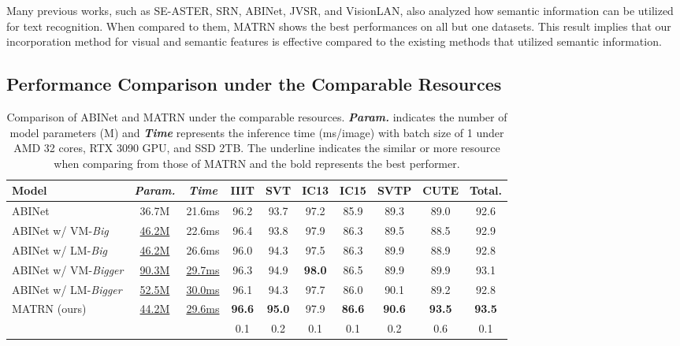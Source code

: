 \documentclass[runningheads]{llncs}
\begin{document}
Many previous works, such as SE-ASTER, SRN, ABINet, JVSR, and VisionLAN, also analyzed how semantic information can be utilized for text recognition. When compared to them, MATRN shows the best performances on all but one datasets. This result implies that our incorporation method for visual and semantic features is effective compared to the existing methods that utilized semantic information.


\subsection{Performance Comparison under the Comparable Resources}

\begin{table}[t]
\tabcolsep=0.1cm
\caption{Comparison of ABINet and MATRN under the comparable resources. \textbf{\textit{Param.}} indicates the number of model parameters (M) and \textbf{\textit{Time}} represents the inference time (ms/image) with batch size of 1 under AMD 32 cores, RTX 3090 GPU, and SSD 2TB. The underline indicates the similar or more resource when comparing from those of MATRN and the bold represents the best performer.}
\begin{adjustbox}{width=1\linewidth,center}
\label{tab:fair}
\small
\centering
\begin{centering}
\begin{tabular}{l|cc|cccccc|c}
\toprule
 \textbf{Model} & \textbf{\textit{Param.}} & \textbf{\textit{Time}} & IIIT & SVT & IC13 & IC15 & SVTP & CUTE & Total. \\
\midrule
 ABINet & 36.7M & 21.6ms & 96.2 & 93.7 & 97.2 & 85.9 & 89.3 & 89.0 & 92.6 \\ \midrule
 ABINet w/ VM-\textit{Big} & \underline{46.2M} & 22.6ms & 96.4 & 93.8 & 97.9 & 86.3 & 89.5 & 88.5 & 92.9  \\
 ABINet w/ LM-\textit{Big} & \underline{46.2M} & 26.6ms & 96.0 & 94.3 & 97.5 & 86.3 & 89.9 & 88.9 & 92.8\\  \midrule
 ABINet w/ VM-\textit{Bigger} & \underline{90.3M} & \underline{29.7ms} & 96.3 & 94.9 & \textbf{98.0} & 86.5 & 89.9 & 89.9 & 93.1 \\ 
 ABINet w/ LM-\textit{Bigger} & \underline{52.5M} & \underline{30.0ms} & 96.1 & 94.3 & 97.7 & 86.0 & 90.1 & 89.2 & 92.8 \\ \midrule
 MATRN (ours) & \underline{44.2M} & \underline{29.6ms} & \textbf{96.6} & \textbf{95.0} & 97.9 & \textbf{86.6} & \textbf{90.6} & \textbf{93.5} & \textbf{93.5} \\
  [-0.3em]
 & & & \scriptsize 0.1 & \scriptsize 0.2 & \scriptsize 0.1 & \scriptsize 0.1 & \scriptsize 0.2 & \scriptsize 0.6 & \scriptsize 0.1 \\
\bottomrule
\end{tabular}
\end{centering}
\end{adjustbox}
\end{table}
\end{document}
